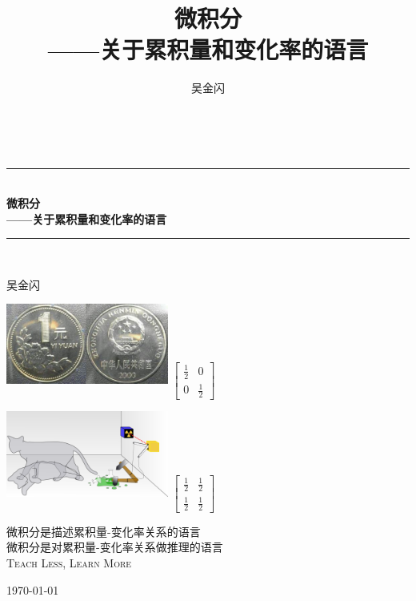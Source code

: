 \documentclass{ctexbook}
\newcommand{\HRule}{\rule{\linewidth}{0.5mm}}
\begin{document}
\title{微积分\\
——关于累积量和变化率的语言}
\author{吴金闪}

\begin{titlepage}
\begin{center}

~

\HRule \\[0.4cm]
{ \huge \bfseries 微积分\\
——关于累积量和变化率的语言 \\[0.4cm] }
\HRule \\[0.5cm]

\begin{center} \Large
吴金闪
\end{center}
\vspace{1cm}
	
\includegraphics[width=0.4\textwidth]{figure/coin} \hspace{2cm} $\begin{bmatrix}\frac{1}{2} & 0 \\
0 & \frac{1}{2} \end{bmatrix}$

\includegraphics[width=0.4\textwidth]{figure/schrodingerscat} \hspace{2cm} $\begin{bmatrix}\frac{1}{2} & \frac{1}{2} \\
\frac{1}{2} & \frac{1}{2}\end{bmatrix}$

\vspace{1cm}

\textsc{\Large 微积分是描述累积量-变化率关系的语言}\\[0.5cm]

\textsc{\Large 微积分是对累积量-变化率关系做推理的语言}\\[0.5cm]
	
\textsc{\Large Teach Less, Learn More}\\[0.5cm]
	
\vfill

{\large \today}

\end{center}
\end{titlepage}
\end{document}
